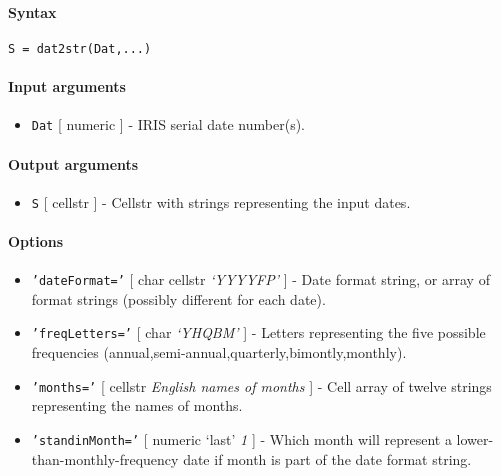 


	\paragraph{Syntax}\label{syntax}

\begin{verbatim}
S = dat2str(Dat,...)
\end{verbatim}

\paragraph{Input arguments}\label{input-arguments}

\begin{itemize}
\itemsep1pt\parskip0pt
\item
  \texttt{Dat} {[} numeric {]} - IRIS serial date number(s).
\end{itemize}

\paragraph{Output arguments}\label{output-arguments}

\begin{itemize}
\itemsep1pt\parskip0pt
\item
  \texttt{S} {[} cellstr {]} - Cellstr with strings representing the
  input dates.
\end{itemize}

\paragraph{Options}\label{options}

\begin{itemize}
\item
  \texttt{'dateFormat='} {[} char \textbar{} cellstr \textbar{}
  \emph{`YYYYFP'} {]} - Date format string, or array of format strings
  (possibly different for each date).
\item
  \texttt{'freqLetters='} {[} char \textbar{} \emph{`YHQBM'} {]} -
  Letters representing the five possible frequencies
  (annual,semi-annual,quarterly,bimontly,monthly).
\item
  \texttt{'months='} {[} cellstr \textbar{} \emph{English names of
  months} {]} - Cell array of twelve strings representing the names of
  months.
\item
  \texttt{'standinMonth='} {[} numeric \textbar{} `last' \textbar{}
  \emph{1} {]} - Which month will represent a
  lower-than-monthly-frequency date if month is part of the date format
  string.
\end{itemize}

